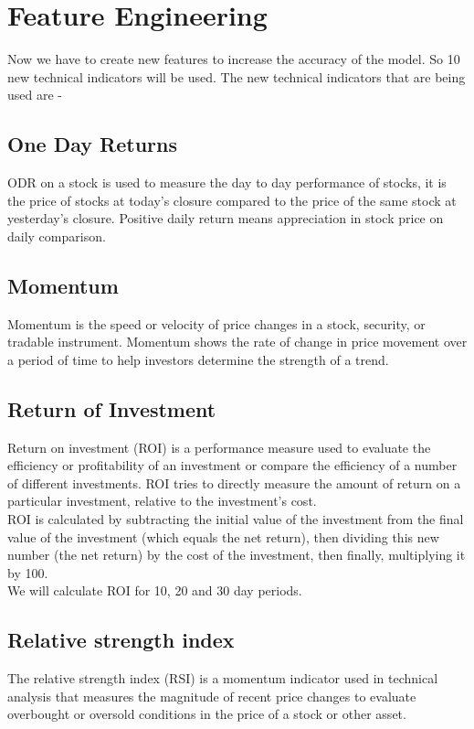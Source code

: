 \documentclass[conference]{IEEEtran}
\begin{document}
\section{Feature Engineering}
Now we have to create new features to increase the accuracy of the model. So 10 new technical indicators will be used. The new technical indicators that are being used are -
\subsection{One Day Returns}
ODR on a stock is used to measure the day to day performance of stocks, it is the price of stocks at today’s closure compared to the price of the same stock at yesterday’s closure. Positive daily return means appreciation in stock price on daily comparison.

\subsection{Momentum}
Momentum is the speed or velocity of price changes in a stock, security, or tradable instrument. Momentum shows the rate of change in price movement over a period of time to help investors determine the strength of a trend.

\subsection{ Return of Investment}
Return on investment (ROI) is a performance measure used to evaluate the efficiency or profitability of an investment or compare the efficiency of a number of different investments. ROI tries to directly measure the amount of return on a particular investment, relative to the investment's cost.\\

ROI is calculated by subtracting the initial value of the investment from the final value of the investment (which equals the net return), then dividing this new number (the net return) by the cost of the investment, then finally, multiplying it by 100.\\

We will calculate ROI for 10, 20 and 30 day periods.


\subsection{ Relative strength index}
The relative strength index (RSI) is a momentum indicator used in technical analysis that measures the magnitude of recent price changes to evaluate overbought or oversold conditions in the price of a stock or other asset.\\
\end{document}
